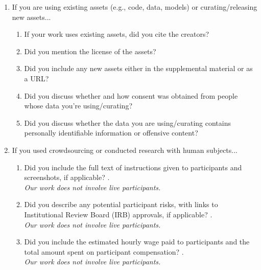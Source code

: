\begin{enumerate}
\item If you are using existing assets (e.g., code, data, models) or curating/releasing new assets...
\begin{enumerate}
  \item If your work uses existing assets, did you cite the creators?
    \answerTODO{}
  \item Did you mention the license of the assets?
    \answerTODO{}
  \item Did you include any new assets either in the supplemental material or as a URL?
    \answerTODO{}
  \item Did you discuss whether and how consent was obtained from people whose data you're using/curating?
    \answerTODO{}
  \item Did you discuss whether the data you are using/curating contains personally identifiable information or offensive content?
    \answerTODO{}
\end{enumerate}

\item If you used crowdsourcing or conducted research with human subjects...
\begin{enumerate}
  \item Did you include the full text of instructions given to participants and screenshots, if applicable?
    \answerNA{}. \\
    \textit{Our work does not involve live participants.}
  \item Did you describe any potential participant risks, with links to Institutional Review Board (IRB) approvals, if applicable?
    \answerNA{}. \\
    \textit{Our work does not involve live participants.}
  \item Did you include the estimated hourly wage paid to participants and the total amount spent on participant compensation?
    \answerNA{}. \\
    \textit{Our work does not involve live participants.}
\end{enumerate}

\end{enumerate}


